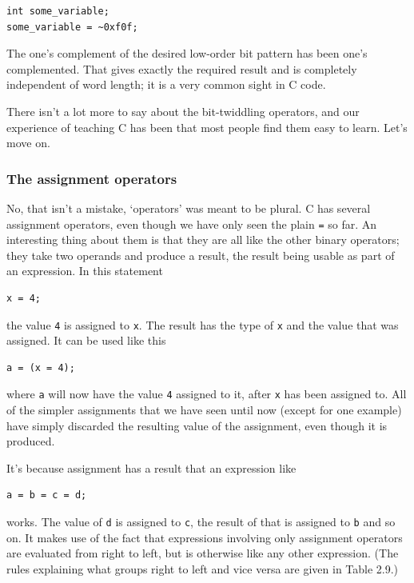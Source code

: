     \begin{Verbatim}
int some_variable;
some_variable = ~0xf0f;
\end{Verbatim}

    The one's complement of the desired low-order bit pattern has been
     one's complemented. That gives exactly the required result and is
     completely independent of word length; it is a very common sight in
     C code.


    There isn't a lot more to say about the bit-twiddling operators, and
     our experience of teaching C has been that most people find them
     easy to learn. Let's move on.


   

   \subsubsection{The assignment operators}
    

    No, that isn't a mistake, `operators' was meant to be plural.
     C has several assignment operators, even though we have only seen
     the plain \texttt{=} so far. An interesting thing about them is
     that they are all like the other binary operators; they take two operands
     and produce a result, the result being usable as part of an expression.
     In this statement


    \begin{Verbatim}
x = 4;
\end{Verbatim}

    the value \texttt{4} is assigned to \texttt{x}. The
     result has the type of \texttt{x} and the value that was
     assigned. It can be used like this


    \begin{Verbatim}
a = (x = 4);
\end{Verbatim}

    where \texttt{a} will now have the value \texttt{4}
     assigned to it, after \texttt{x} has been assigned to. All of
     the simpler assignments that we have seen until now (except for one
     example) have simply discarded the resulting value of the assignment,
     even though it is produced.


    It's because assignment has a result that an expression like


    \begin{Verbatim}
a = b = c = d;
\end{Verbatim}

    works. The value of \texttt{d} is assigned
     to \texttt{c}, the result of that is assigned
     to \texttt{b} and so on. It makes use of the fact that
     expressions involving only assignment operators are evaluated from right
     to left, but is otherwise like any other expression. (The rules
     explaining what groups right to left and vice versa are given in
     Table 2.9.)


